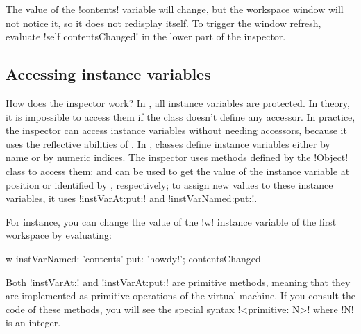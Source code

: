 \documentclass[a4paper,10pt,twoside]{book}
\begin{document}
The value of the \ct!contents! variable will change, but the workspace window will not notice it, so it does not redisplay itself.
To trigger the window refresh, evaluate \ct!self contentsChanged! in the lower part of the inspector.

\subsection{Accessing instance variables}

How does the inspector work?
In \st, all instance variables are protected.
In theory, it is impossible to access them  if the class doesn't define any accessor.
In practice, the inspector can access instance variables without needing accessors, because it uses the reflective abilities of \st.
In \st, classes define instance variables either by name or by numeric indices.
The inspector uses methods defined by the \ct!Object! class to access them:  and  can be used to get the value of the instance variable at position  or identified by , respectively; to assign new values to these instance variables, it uses \ct!instVarAt:put:! and \ct!instVarNamed:put:!.

For instance, you can change the value of the \ct!w! instance variable  of the first workspace by evaluating:
\begin{code}{}
w instVarNamed: 'contents' put: 'howdy!'; contentsChanged
\end{code}


Both \ct!instVarAt:! and \ct!instVarAt:put:! are primitive methods, meaning that they are implemented as primitive operations of the \pharo virtual machine.
If you consult the code of these methods, you will see the special syntax \ct!<primitive: N>! where \ct!N! is an integer. 
\end{document}

